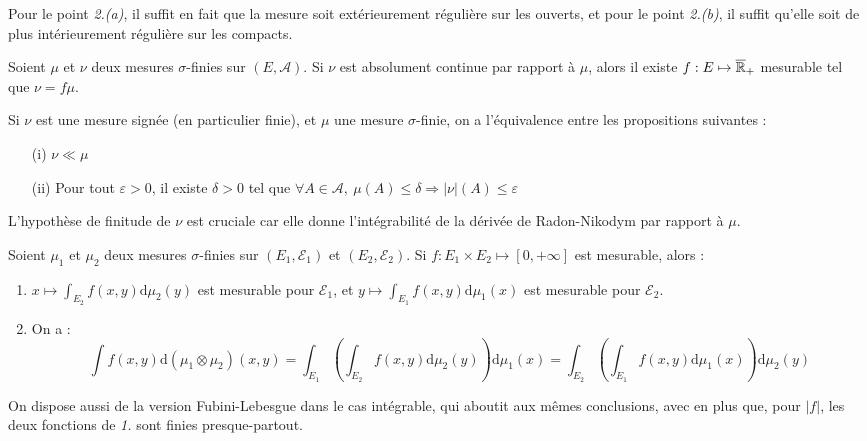 \documentclass[11pt,a4paper]{article}
\begin{document}
\begin{rmq}
Pour le point \textit{2.(a)}, il suffit en fait que la mesure soit extérieurement régulière sur les ouverts, et pour le point \textit{2.(b)}, il suffit qu'elle soit de plus intérieurement régulière sur les compacts.
\end{rmq}


\begin{thmstar}
Soient $\mu$ et $\nu$ deux mesures $\sigma$-finies sur $(E,\mathcal{A})$. Si $\nu$ est absolument continue par rapport à $\mu$, alors il existe $f : E \mapsto \overline{\mathbb R}_+$ mesurable tel que $\nu=f\mu$.
\end{thmstar}

\begin{rmq}
Si $\nu$ est une mesure signée (en particulier finie), et $\mu$ une mesure $\sigma$-finie, on a l'équivalence entre les propositions suivantes :
\begin{itemize}
\item[(i)] $\nu \ll \mu$
\item[(ii)] Pour tout $\varepsilon >0$, il existe $\delta > 0$ tel que  $\forall A\in \mathcal{A}, \ \mu(A) \leq \delta \Rightarrow |\nu|(A) \leq \varepsilon$
\end{itemize}
L'hypothèse de finitude de $\nu$ est cruciale car elle donne l'intégrabilité de la dérivée de Radon-Nikodym par rapport à $\mu$.
\end{rmq}

\begin{thmstar}
Soient $\mu_1$ et $\mu_2$ deux mesures $\sigma$-finies sur $(E_1,\mathcal{E}_1)$ et $(E_2,\mathcal{E}_2)$. Si $f : E_1 \times E_2 \mapsto [0,+\infty]$ est mesurable, alors : 
\begin{enumerate}
\item $\displaystyle x\mapsto \int_{E_2} f(x,y) \mathrm{d}\mu_2(y)$ est mesurable pour $\mathcal{E}_1$, et $\displaystyle y\mapsto \int_{E_1} f(x,y) \mathrm{d}\mu_1(x)$ est mesurable pour $\mathcal{E}_2$. 
\item On a :
\[\int f(x,y)\mathrm{d}(\mu_1 \otimes \mu_2)(x,y)=\int_{E_1}\left(\int_{E_2} f(x,y) \mathrm{d}\mu_2(y)\right)\mathrm{d}\mu_1(x)=\int_{E_2}\left(\int_{E_1} f(x,y) \mathrm{d}\mu_1(x)\right)\mathrm{d}\mu_2(y) \]
\end{enumerate}
\end{thmstar}

\begin{rmq}
On dispose aussi de la version Fubini-Lebesgue dans le cas intégrable, qui aboutit aux mêmes conclusions, avec en plus que, pour $|f|$, les deux fonctions de \textit{1.} sont finies presque-partout.
\end{rmq}
\end{document}
